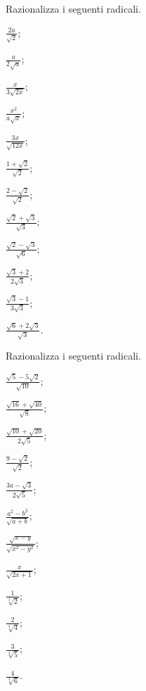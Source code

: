 \begin{esercizio}[\Ast]
 \label{ese:2.86}
Razionalizza i seguenti radicali.
 \begin{multicols}{4}
 \begin{enumeratea}
 \item $\frac{2a}{\sqrt 2}$;
 \item $\frac a{2\sqrt a}$;
 \item $\frac x{3\sqrt{2x}}$;
 \item $\frac{x^2}{a\sqrt x}$;
 \item $\frac{3x}{\sqrt{12x}}$;
 \item $\frac{1+\sqrt 2}{\sqrt 2}$;
 \item $\frac{2-\sqrt 2}{\sqrt 2}$;
 \item $\frac{\sqrt 2+\sqrt 3}{\sqrt 3}$;
 \item $\frac{\sqrt 2-\sqrt 3}{\sqrt 6}$;
 \item $\frac{\sqrt 3+2}{2\sqrt 3}$;
 \item $\frac{\sqrt 3-1}{3\sqrt 3}$;
 \item $\frac{\sqrt 6+2\sqrt 3}{\sqrt 3}$.
 \end{enumeratea}
 \end{multicols}
\end{esercizio}
\pagebreak
\begin{esercizio}[\Ast]
 \label{ese:2.87}
Razionalizza i seguenti radicali.
 \begin{multicols}{4}
 \begin{enumeratea}
 \item $\frac{\sqrt 5-5\sqrt 2}{\sqrt{10}}$;
 \item $\frac{\sqrt{16}+\sqrt{40}}{\sqrt 8}$;
 \item $\frac{\sqrt{10}+\sqrt{20}}{2\sqrt 5}$;
 \item $\frac{9-\sqrt 2}{\sqrt 2}$;
 \item $\frac{3a-\sqrt 3}{2\sqrt 5}$;
 \item $\frac{a^2-b^2}{\sqrt{a+b}}$;
 \item $\frac{\sqrt{x-y}}{\sqrt{x^2-y^2}}$;
 \item $\frac x{\sqrt{2x+1}}$;
 \item $\frac 1{\sqrt[3]2}$;
 \item $\frac 2{\sqrt[3]4}$;
 \item $\frac 3{\sqrt[3]5}$;
 \item $\frac 4{\sqrt[3]6}$.
 \end{enumeratea}
 \end{multicols}
\end{esercizio}

